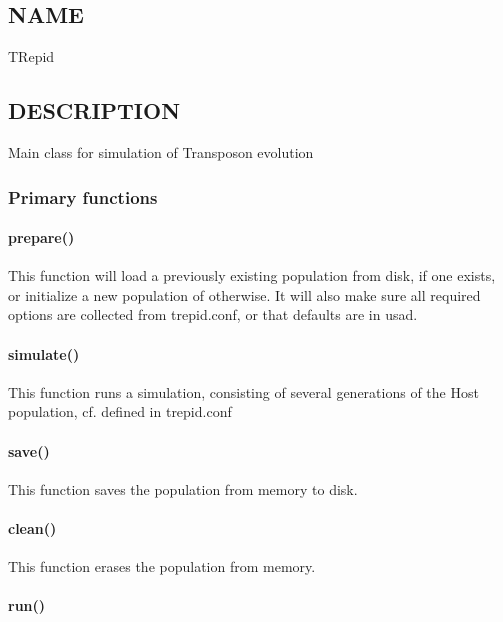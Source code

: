 \subsection{NAME\label{NAME}}


TRepid

\subsection{DESCRIPTION\label{DESCRIPTION}}


Main class for simulation of Transposon evolution

\subsubsection*{Primary functions\label{Primary_functions}}
\paragraph*{prepare()\label{prepare_}}


This function will load a previously existing population from disk, if
one exists, or initialize a new population of otherwise. It will also
make sure all required options are collected from trepid.conf, or that
defaults are in usad.

\paragraph*{simulate()\label{simulate_}}


This function runs a simulation, consisting of several generations of
the Host population, cf. defined in trepid.conf

\paragraph*{save()\label{save_}}


This function saves the population from memory to disk.

\paragraph*{clean()\label{clean_}}


This function erases the population from memory.

\paragraph*{run()\label{run_}}


